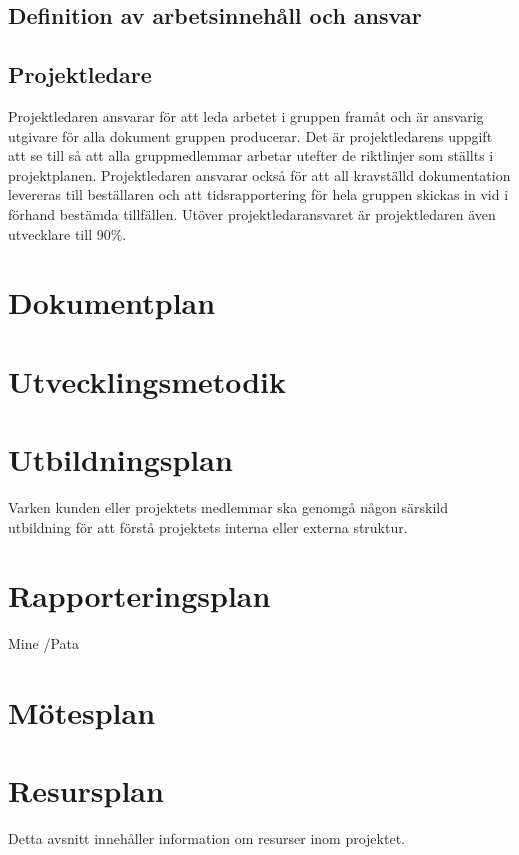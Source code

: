 \documentclass{article}
\begin{document}
\subsection{Definition av arbetsinnehåll och ansvar}
\subsection{Projektledare}
Projektledaren ansvarar för att leda arbetet i gruppen framåt och är ansvarig utgivare för alla dokument gruppen producerar. Det är projektledarens uppgift att se till så att alla gruppmedlemmar arbetar utefter de riktlinjer som ställts i projektplanen. Projektledaren ansvarar också för att all kravställd dokumentation levereras till beställaren och att tidsrapportering för hela gruppen skickas in vid i förhand bestämda tillfällen. Utöver projektledaransvaret är projektledaren även utvecklare till 90\%.

\section{Dokumentplan}


\section{Utvecklingsmetodik}

\section{Utbildningsplan}
Varken kunden eller projektets medlemmar ska genomgå någon särskild utbildning för att förstå projektets interna eller externa struktur.

\section{Rapporteringsplan}
Mine /Pata

\section{Mötesplan}
\section{Resursplan}
Detta avsnitt innehåller information om resurser inom projektet.
\end{document}
